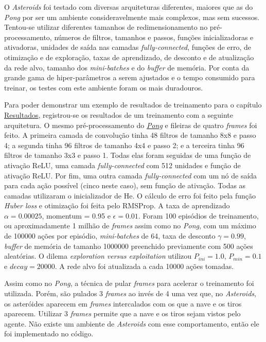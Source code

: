 O \textit{Asteroids} foi testado com diversas arquiteturas diferentes, maiores que as do \textit{Pong} por ser um ambiente consideravelmente mais complexos, mas sem sucessos.
Tentou-se utilizar diferentes tamanhos de redimensionamento no pré-processamento, números de filtros, tamanhos e passos, funções inicializadoras e ativadoras, unidades de saída nas camadas \textit{fully-connected}, funções de erro, de otimização e de exploração, taxas de aprendizado, de desconto e de atualização da rede alvo, tamanho dos \textit{mini-batches} e do \textit{buffer} de memória.
Por conta da grande gama de hiper-parâmetros a serem ajustados e o tempo consumido para treinar, os testes com este ambiente foram os mais duradouros.

Para poder demonstrar um exemplo de resultados de treinamento para o capítulo \hyperref[cap:resultados]{Resultados}, registrou-se os resultados de um treinamento com a seguinte arquitetura.
O mesmo pré-processamento do \hyperref[sec:arq_pong]{\textit{Pong}} e fileiras de quatro \textit{frames} foi feito.
A primeira camada de convolução tinha 48 filtros de tamanho 8x8 e passo 4; a segunda tinha 96 filtros de tamanho 4x4 e passo 2; e a terceira tinha 96 filtros de tamanho 3x3 e passo 1.
Todas elas foram seguidas de uma função de ativação ReLU, uma camada \textit{fully-connected} com 512 unidades e função de ativação ReLU.
Por fim, uma outra camada \textit{fully-connected} com um nó de saída para cada ação possível (cinco neste caso), sem função de ativação.
Todas as camadas utilizaram o inicializador de He.
O cálculo de erro foi feito pela função \textit{Huber loss} e otimização foi feita pelo RMSProp.
A taxa de aprendizado $\alpha = 0.00025$, momentum = 0.95 e $\epsilon = 0.01$.
Foram 100 episódios de treinamento, ou aproximadamente 1 milhão de \textit{frames} assim como no \textit{Pong}, com um máximo de 100000 ações por episódio, \textit{mini-batches} de 64, taxa de desconto $\gamma = 0.99$, \textit{buffer} de memória de tamanho 1000000 preenchido previamente com 500 ações aleatórias.
O dilema \textit{exploration versus exploitation} utilizou $P_{ini} = 1.0$, $P_{min} = 0.1$ e $decay = 20000$. A rede alvo foi atualizada a cada 10000 ações tomadas.

Assim como no \textit{Pong}, a técnica de pular \textit{frames} para acelerar o treinamento foi utilizada.
Porém, são pulados 3 \textit{frames} ao invés de 4 uma vez que, no \textit{Asteroids}, os asteróides aparecem em \textit{frames} intercalados com os que a nave e os tiros aparecem.
Utilizar 3 \textit{frames} permite que a nave e os tiros sejam vistos pelo agente.
Não existe um ambiente de \textit{Asteroids} com esse comportamento, então ele foi implementado no código.

